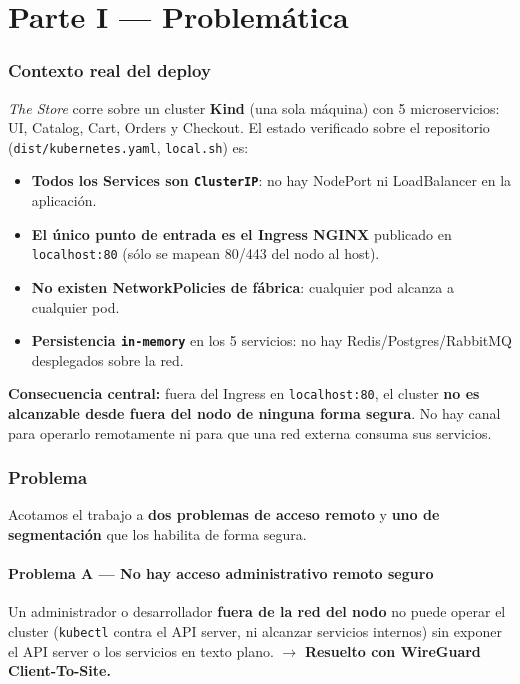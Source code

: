 \documentclass[11pt,a4paper]{article}
\newcommand{\cmd}[1]{\texttt{#1}}
\begin{document}
\part*{Parte I — Problemática}

\section{Contexto real del deploy}
\textit{The Store} corre sobre un cluster \textbf{Kind} (una sola máquina) con 5
microservicios: UI, Catalog, Cart, Orders y Checkout. El estado verificado sobre
el repositorio (\cmd{dist/kubernetes.yaml}, \cmd{local.sh}) es:

\begin{itemize}
  \item \textbf{Todos los Services son \cmd{ClusterIP}}: no hay NodePort ni
        LoadBalancer en la aplicación.
  \item \textbf{El único punto de entrada es el Ingress NGINX} publicado en
        \cmd{localhost:80} (sólo se mapean 80/443 del nodo al host).
  \item \textbf{No existen NetworkPolicies de fábrica}: cualquier pod alcanza a
        cualquier pod.
  \item \textbf{Persistencia \cmd{in-memory}} en los 5 servicios: no hay
        Redis/Postgres/RabbitMQ desplegados sobre la red.
\end{itemize}

\noindent\textbf{Consecuencia central:} fuera del Ingress en \cmd{localhost:80},
el cluster \textbf{no es alcanzable desde fuera del nodo de ninguna forma
segura}. No hay canal para operarlo remotamente ni para que una red externa
consuma sus servicios.

\section{Problema}
Acotamos el trabajo a \textbf{dos problemas de acceso remoto} y \textbf{uno de
segmentación} que los habilita de forma segura.

\subsection*{Problema A — No hay acceso administrativo remoto seguro}
Un administrador o desarrollador \textbf{fuera de la red del nodo} no puede operar
el cluster (\cmd{kubectl} contra el API server, ni alcanzar servicios internos)
sin exponer el API server o los servicios en texto plano.
\;$\rightarrow$\; \textbf{Resuelto con WireGuard Client-To-Site.}
\end{document}
